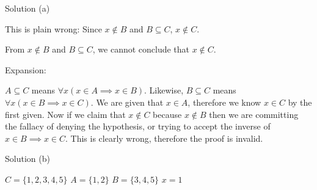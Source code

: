 \documentclass{article}
\begin{document}
Solution (a)

This is plain wrong: Since $x \notin B$ and $B \subseteq C$, $x \notin
C$.

From $x \notin B$ and $B \subseteq C$, we cannot conclude that $x
\notin C$.

Expansion:

$A \subseteq C$ means $\forall x ( x \in A \implies x \in B )$. Likewise,
$B \subseteq C$ means $\forall x ( x \in B \implies x \in C )$. We are given
that $x \in A$, therefore we know $x \in C$ by the first given. Now if we
claim that $x \notin C$ because $x \notin B$ then we are committing the 
fallacy of denying the hypothesis, or trying to accept the inverse of
$x \in B \implies x \in C$. This is clearly wrong, therefore the proof
is invalid.

Solution (b)

$ C = \{1,2,3,4,5\} $
$ A = \{1,2\}$
$ B = \{3,4,5\}$
$ x = 1 $
\end{document}
